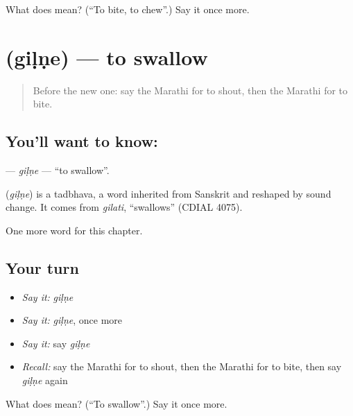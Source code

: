 \begin{tcolorbox}[breakable,colback=teal!4,colframe=teal!35!black,title={Before you move on}]
What does  mean? (\textquotedblleft{}To bite, to chew\textquotedblright{}.) Say it once more.
\end{tcolorbox}
\section[\texorpdfstring{\mr{गिळणे} (giḷṇe)}{गिळणे (giḷṇe)}]{ (giḷṇe) — to swallow}

\label{lesson:MR-C156-gilne}



\begin{quote}
Before the new one: say the Marathi for to shout, then the Marathi for to bite.
\end{quote}

\subsection*{You'll want to know: }
\textbf{} — \emph{giḷṇe} — \textquotedblleft{}to swallow\textquotedblright{}.

\begin{cousinweb}
\textbf{} (\emph{giḷṇe}) is a tadbhava, a word inherited from Sanskrit and reshaped by sound change. It comes from \emph{gilati}, \textquotedblleft{}swallows\textquotedblright{} (CDIAL 4075).
\end{cousinweb}

\begin{grammarlens}[title={What you've built}]
One more word for this chapter.
\end{grammarlens}

\subsection*{Your turn}
\begin{itemize}
\raggedright
  \item \emph{Say it:} \emph{giḷṇe}
  \item \emph{Say it:} \emph{giḷṇe}, once more
  \item \emph{Say it:} say \emph{giḷṇe}
  \item \emph{Recall:} say the Marathi for to shout, then the Marathi for to bite, then say \emph{giḷṇe} again
\end{itemize}

\begin{tcolorbox}[breakable,colback=teal!4,colframe=teal!35!black,title={Before you move on}]
What does  mean? (\textquotedblleft{}To swallow\textquotedblright{}.) Say it once more.
\end{tcolorbox}
